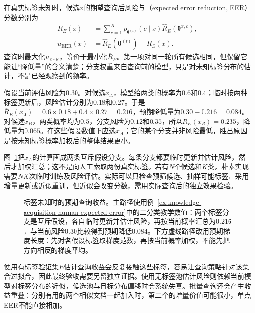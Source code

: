 在真实标签未知时，候选$x$的期望查询后风险与（expected error reduction, EER）分数分别为
\begin{align}
  \overline R_E(x)
    &=\sum_{c=1}^{K}
      p_{\bm{\theta}^{(t)}}(c\mid x)
      \widehat R_E(\bm{\theta}^{x,c}),
  \label{eq:knowledge-acquisition-human-expected-future-risk}\\
  u_{\mathrm{EER}}(x)
    &=\widehat R_E(\bm{\theta}^{(t)})
      -\overline R_E(x).
  \label{eq:knowledge-acquisition-human-expected-error-reduction}
\end{align}
查询时最大化$u_{\mathrm{EER}}$，等价于最小化$\overline R_E$。第一项对同一轮所有候选相同，但保留它能让“降低量”的含义清楚；分支权重来自查询前的模型，只是对未知标签分布的估计，不是已经观察到的频率。

\begin{example}[可复算的预期误差降低]
  \label{ex:knowledge-acquisition-human-expected-error}
  假设当前评估风险为$0.30$。对候选$x_A$，模型给两类的概率为$0.6$和$0.4$；临时按两种标签更新后，风险估计分别为$0.18$和$0.27$。于是$\overline R_E(x_A)=0.6\times0.18+0.4\times0.27=0.216$，预期降低量为$0.30-0.216=0.084$。对候选$x_B$，两类概率均为$0.5$，分支风险为$0.12$和$0.35$，所以$\overline R_E(x_B)=0.235$，降低量为$0.065$。在这些假设数值下应选$x_A$；它的某个分支并非风险最低，胜出原因是按未知标签概率加权后的整体结果更小。
\end{example}

图~\ref{fig:knowledge-acquisition-human-expected-utility}把$x_A$的计算画成两条互斥假设分支。每条分支都要临时更新并估计风险，然后才加权汇总；这不是向人工索取两份真实标签。若有$N$个候选和$K$类，朴素实现需要$NK$次临时训练及风险评估。实际可以只检查预筛候选、抽样可能标签、采用增量更新或近似重训，但近似会改变分数，需用实际查询后的独立效果检验。

\begin{figure}[htbp]
  \centering
  
  \caption{标签未知时的预期查询收益。主路径使用例~\ref{ex:knowledge-acquisition-human-expected-error}中的二分类教学数值：两个标签分支是互斥假设，各自临时更新并估计风险，再按当前概率汇总为$0.216$，与当前风险$0.30$比较得到预期降低$0.084$。下方虚线路径改用预期梯度长度：先对各假设标签取梯度范数，再按当前概率加权，不能先把方向相反的梯度平均。}
  \label{fig:knowledge-acquisition-human-expected-utility}
\end{figure}

使用有标签验证集$E$估计查询收益会反复接触这些标签，容易让查询策略针对该集合过拟合，因此最终验收需要另留独立证据。使用无标签池估计风险则依赖当前模型对标签分布的近似，候选池与目标分布偏移时会系统失真。批量查询还会产生收益重叠：分别有用的两个相似文档一起加入时，第二个的增量价值可能很小，单点EER不能直接相加。

